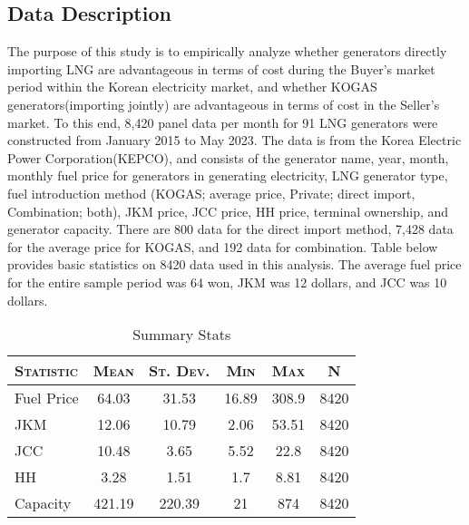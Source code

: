 \documentclass[leqno]{article}
\begin{document}
\subsection{Data Description}
The purpose of this study is to empirically analyze whether generators directly importing LNG are advantageous in terms of cost during the Buyer's market period within the Korean electricity market, and whether KOGAS generators(importing jointly) are advantageous in terms of cost in the Seller's market. To this end, 8,420 panel data per month for 91 LNG generators were constructed from January 2015 to May 2023. The data is from the Korea Electric Power Corporation(KEPCO), and consists of the generator name, year, month, monthly fuel price for generators in generating electricity, LNG generator type, fuel introduction method (KOGAS; average price, Private; direct import, Combination; both), JKM price, JCC price, HH price, terminal ownership, and generator capacity. There are 800 data for the direct import method, 7,428 data for the average price for KOGAS, and 192 data for combination. Table below provides basic statistics on 8420 data used in this analysis. The average fuel price for the entire sample period was 64 won, JKM was 12 dollars, and JCC was 10 dollars.





\begin{table}[htbp]\centering
\def\sym#1{\ifmmode^{#1}\else\(^{#1}\)\fi}
\caption{Summary Stats}
\begin{tabular}{l*{1}{ccccc}}
\toprule
\addlinespace
\textsc{Statistic}            &        \multicolumn{1}{c}{\textsc{Mean}}&         \multicolumn{1}{c}{\textsc{St. Dev.}}&        \multicolumn{1}{c}{\textsc{Min}}&         \multicolumn{1}{c}{\textsc{Max}}&           \multicolumn{1}{c}{\textsc{N}}\\
\hline \hline
\addlinespace
Fuel Price       &    64.03&    31.53&      16.89&       308.9&        8420\\
JKM         &    12.06&    10.79&       2.06&      53.51&        8420\\
JCC         &    10.48 &    3.65&        5.52&        22.8&        8420\\
HH          &    3.28&    1.51 &         1.7&        8.81&        8420\\
Capacity    &    421.19&    220.39&          21&         874&        8420\\
\bottomrule
\end{tabular}
\end{table}
\end{document}
